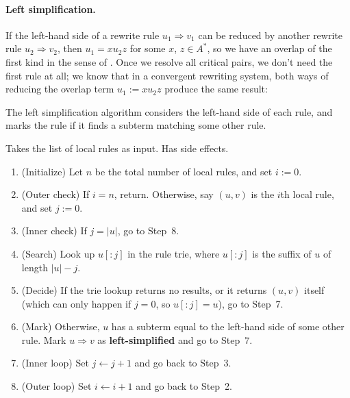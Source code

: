 \documentclass[../generics]{subfiles}
\begin{document}
\paragraph{Left simplification.} If the left-hand side of a rewrite rule $u_1\Rightarrow v_1$ can be reduced by another rewrite rule $u_2\Rightarrow v_2$, then $u_1=xu_2z$ for some $x$, $z\in A^*$, so we have an overlap of the first kind in the sense of . Once we resolve all critical pairs, we don't need the first rule at all; we know that in a convergent rewriting system, both ways of reducing the overlap term $u_1:=xu_2z$ produce the same result:
\begin{center}
\end{center}
The left simplification algorithm considers the left-hand side of each rule, and marks the rule if it finds a subterm matching some other rule.
\begin{algorithm}\label{left simplification}
Takes the list of local rules as input. Has side effects.
\begin{enumerate}
\item (Initialize) Let $n$ be the total number of local rules, and set $i:=0$.
\item (Outer check) If $i=n$, return. Otherwise, say $(u, v)$ is the $i$th local rule, and set $j:=0$.
\item (Inner check) If $j=|u|$, go to Step~8.
\item (Search) Look up $u[:j]$ in the rule trie, where $u[:j]$ is the suffix of $u$ of length $|u|-j$.
\item (Decide) If the trie lookup returns no results, or it returns $(u, v)$ itself (which can only happen if $j=0$, so $u[:j]=u$), go to Step~7.
\item (Mark) Otherwise, $u$ has a subterm equal to the left-hand side of some other rule. Mark $u\Rightarrow v$ as \textbf{left-simplified} and go to Step~7.
\item (Inner loop) Set $j\leftarrow j+1$ and go back to Step~3.
\item (Outer loop) Set $i\leftarrow i+1$ and go back to Step~2.
\end{enumerate}
\end{algorithm}
\end{document}
